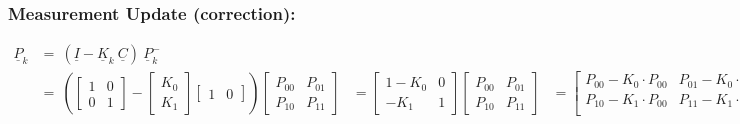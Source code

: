 \subsubsection{Measurement Update (correction):}
\[
\begin{aligned}
	\underline{P}_{k} &= \ (\underline{I} - \underline{K}_{k} \ \underline{C}) \ \underline{P}_{k}^- \\ 
	&= \ \left( \begin{bmatrix} 
		1 & 0 \\ 
		0 & 1 
	\end{bmatrix}
	- 
	\begin{bmatrix} 
		K_{0} \\  
		K_{1} 
	\end{bmatrix} 
	\begin{bmatrix} 
		1 & 0 
	\end{bmatrix}  
	\right) 
	\begin{bmatrix}
		P_{00} & P_{01} \\ 
		P_{10} & P_{11} 
	\end{bmatrix} 
	&=  
	\begin{bmatrix} 
		1 - K_{0} & 0 \\ 
		-K_{1} & 1 
	\end{bmatrix} 
	\begin{bmatrix} 
		P_{00} & P_{01} \\ 
		P_{10} & P_{11} 
	\end{bmatrix}
	&= 
	\begin{bmatrix} 
		P_{00} - K_{0} \cdot P_{00} & P_{01} - K_{0} \cdot P_{01} \\
		P_{10} - K_{1} \cdot P_{00} & P_{11} - K_{1} \cdot P_{01} \\
	\end{bmatrix}
\end{aligned}
\]



